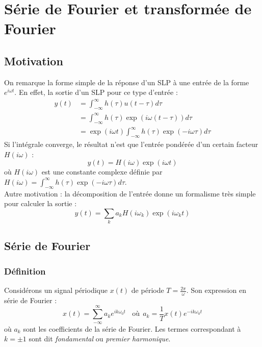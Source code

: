 \chapter{Série de Fourier et transformée de Fourier}

\section{Motivation}
On remarque la forme simple de la réponse d'un SLP à  une entrée de
la forme $e^{i\omega t}$. En effet, la sortie d'un SLP pour ce type
d'entrée :
\begin{equation}
\begin{array}{ll}
y(t) &= \int_{-\infty}^\infty h(\tau)u(t-\tau)d\tau\\
 &= \int_{-\infty}^\infty h(\tau)\exp(i\omega(t-\tau))d\tau\\
 &= \exp(i\omega t)\int_{-\infty}^\infty h(\tau)\exp(-i\omega\tau)
 d\tau
\end{array}
\end{equation}
Si l'intégrale converge, le résultat n'est que l'entrée pondérée 
d'un certain facteur $H(i\omega)$ :
\begin{equation}
y(t) = H(i\omega)\exp(i\omega t)
\end{equation}
où $H(i\omega)$ est une constante complexe définie par $H(i\omega) =
\int_{-\infty}^\infty h(\tau)\exp(-i\omega\tau)d\tau$.\\
Autre motivation : la décomposition de l'entrée donne un formalisme
très simple pour calculer la sortie :
\begin{equation}
y(t) = \sum_k a_kH(i\omega_k)\exp(i\omega_kt)
\end{equation}

\section{Série de Fourier}
	\subsection{Définition}
	Considérons un signal périodique $x(t)$ de période $T=\frac{2\pi}
	{\omega}$. Son expression en série de Fourier :
	\begin{equation}
	x(t) = \sum_{-\infty}^\infty a_ke^{ik\omega_0t}\ \ \ \ \text{où}\ \ 
	a_k = \frac{1}{T}x(t)e^{-ik\omega_0t}
	\end{equation}
	où $a_k$ sont les coefficients de la série de Fourier. Les termes
	correspondant à $k=\pm 1$ sont dit \textit{fondamental} ou \textit{
	premier harmonique}.\ \\
	
